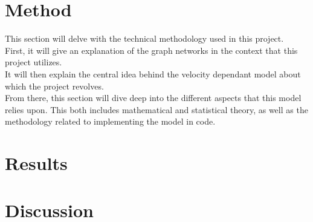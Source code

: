 \documentclass{article}
\begin{document}

\clearpage



\section{Method}
\label{sec:Method}
This section will delve with the technical methodology used in this project.
\\
First, it will give an explanation of the graph networks in the context that this project utilizes. 
\\
It will then explain the central idea behind the velocity dependant model about which the project revolves. 
\\
From there, this section will dive deep into the different aspects that this model relies upon.
This both includes mathematical and statistical theory, as well as the methodology related to implementing the model in code.









\clearpage


\section{Results}

\clearpage

\clearpage

\clearpage

\section{Discussion}

\clearpage







\clearpage

%
%
\printbibliography
\clearpage


\end{document}
